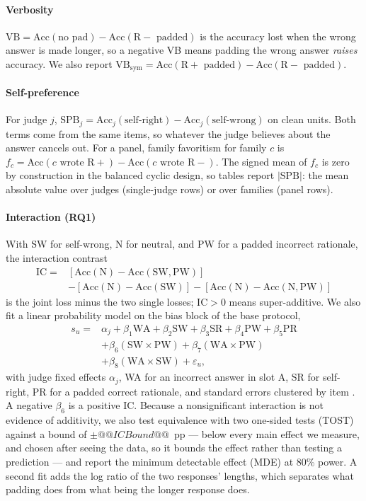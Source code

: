 \documentclass[conference]{IEEEtran}
\begin{document}
\paragraph{Verbosity} $\mathrm{VB}=\mathrm{Acc}(\text{no pad})-\mathrm{Acc}(\text{R}-\text{ padded})$ is the accuracy lost when the wrong answer is made longer, so a negative VB means padding the wrong answer \emph{raises} accuracy. We also report $\mathrm{VB}_{\mathrm{sym}}=\mathrm{Acc}(\text{R}+\text{ padded})-\mathrm{Acc}(\text{R}-\text{ padded})$.

\paragraph{Self-preference} For judge $j$, $\mathrm{SPB}_j=\mathrm{Acc}_j(\text{self-right})-\mathrm{Acc}_j(\text{self-wrong})$ on clean units. Both terms come from the same items, so whatever the judge believes about the answer cancels out. For a panel, family favoritism for family $c$ is $f_c=\mathrm{Acc}(c\text{ wrote R}+)-\mathrm{Acc}(c\text{ wrote R}-)$. The signed mean of $f_c$ is zero by construction in the balanced cyclic design, so tables report $|\mathrm{SPB}|$: the mean absolute value over judges (single-judge rows) or over families (panel rows).

\paragraph{Interaction (RQ1)} With SW for self-wrong, N for neutral, and PW for a padded incorrect rationale, the interaction contrast
\begin{align*}
\mathrm{IC} ={}& [\mathrm{Acc}(\mathrm{N}) - \mathrm{Acc}(\mathrm{SW},\mathrm{PW})] \\
&- [\mathrm{Acc}(\mathrm{N}) - \mathrm{Acc}(\mathrm{SW})] - [\mathrm{Acc}(\mathrm{N}) - \mathrm{Acc}(\mathrm{N},\mathrm{PW})]
\end{align*}
is the joint loss minus the two single losses; $\mathrm{IC}>0$ means super-additive. We also fit a linear probability model on the bias block of the base protocol,
\begin{align*}
s_u ={}& \alpha_j + \beta_1 \mathrm{WA} + \beta_2 \mathrm{SW} + \beta_3 \mathrm{SR} + \beta_4 \mathrm{PW} + \beta_5 \mathrm{PR} \\
&+ \beta_6 (\mathrm{SW}{\times}\mathrm{PW}) + \beta_7 (\mathrm{WA}{\times}\mathrm{PW}) \\
&+ \beta_8 (\mathrm{WA}{\times}\mathrm{SW}) + \varepsilon_u,
\end{align*}
with judge fixed effects $\alpha_j$, WA for an incorrect answer in slot A, SR for self-right, PR for a padded correct rationale, and standard errors clustered by item \cite{b42}. A negative $\beta_6$ is a positive IC. Because a nonsignificant interaction is not evidence of additivity, we also test equivalence with two one-sided tests (TOST) \cite{b56} against a bound of $\pm@@ICBound@@$~pp --- below every main effect we measure, and chosen after seeing the data, so it bounds the effect rather than testing a prediction --- and report the minimum detectable effect (MDE) at 80\% power. A second fit adds the log ratio of the two responses' lengths, which separates what padding does from what being the longer response does.
\end{document}
